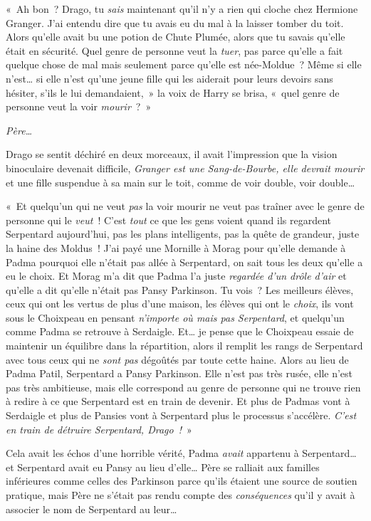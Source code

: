 «~Ah bon~? Drago, tu \emph{sais} maintenant qu'il n'y a rien qui cloche chez Hermione Granger. J'ai entendu dire que tu avais eu du mal à la laisser tomber du toit. Alors qu'elle avait bu une potion de Chute Plumée, alors que tu savais qu'elle était en sécurité. Quel genre de personne veut la \emph{tuer}, pas parce qu'elle a fait quelque chose de mal mais seulement parce qu'elle est née-Moldue~? Même si elle n'est… si elle n'est qu'une jeune fille qui les aiderait pour leurs devoirs sans hésiter, s'ils le lui demandaient,~» la voix de Harry se brisa, «~quel genre de personne veut la voir \emph{mourir}~?~»

\emph{Père…}

Drago se sentit déchiré en deux morceaux, il avait l'impression que la vision binoculaire devenait difficile, \emph{Granger est une Sang-de-Bourbe, elle devrait mourir} et une fille suspendue à sa main sur le toit, comme de voir double, voir double…

«~Et quelqu'un qui ne veut \emph{pas} la voir mourir ne veut pas traîner avec le genre de personne qui le \emph{veut}~! C'est \emph{tout} ce que les gens voient quand ils regardent Serpentard aujourd'hui, pas les plans intelligents, pas la quête de grandeur, juste la haine des Moldus~! J'ai payé une Mornille à Morag pour qu'elle demande à Padma pourquoi elle n'était pas allée à Serpentard, on sait tous les deux qu'elle a eu le choix. Et Morag m'a dit que Padma l'a juste \emph{regardée d'un drôle d'air} et qu'elle a dit qu'elle n'était pas Pansy Parkinson. Tu vois~? Les meilleurs élèves, ceux qui ont les vertus de plus d'une maison, les élèves qui ont le \emph{choix}, ils vont sous le Choixpeau en pensant \emph{n'importe où mais pas Serpentard}, et quelqu'un comme Padma se retrouve à Serdaigle. Et… je pense que le Choixpeau essaie de maintenir un équilibre dans la répartition, alors il remplit les rangs de Serpentard avec tous ceux qui ne \emph{sont pas} dégoûtés par toute cette haine. Alors au lieu de Padma Patil, Serpentard a Pansy Parkinson. Elle n'est pas très rusée, elle n'est pas très ambitieuse, mais elle correspond au genre de personne qui ne trouve rien à redire à ce que Serpentard est en train de devenir. Et plus de Padmas vont à Serdaigle et plus de Pansies vont à Serpentard plus le processus s'accélère. \emph{C'est en train de détruire Serpentard, Drago~!}~»

Cela avait les échos d'une horrible vérité, Padma \emph{avait} appartenu à Serpentard… et Serpentard avait eu Pansy au lieu d'elle… Père se ralliait aux familles inférieures comme celles des Parkinson parce qu'ils étaient une source de soutien pratique, mais Père ne s'était pas rendu compte des \emph{conséquences} qu'il y avait à associer le nom de Serpentard au leur…

